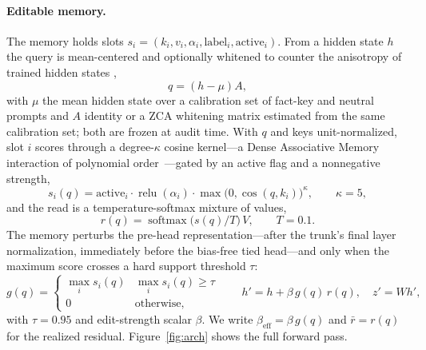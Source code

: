 \documentclass[11pt]{article}
\theoremstyle{remark}
\DeclareMathOperator{\relu}{relu}
\DeclareMathOperator{\softmax}{softmax}
\begin{document}
\paragraph{Editable memory.} The memory holds slots
$s_i=(k_i,v_i,\alpha_i,\text{label}_i,\text{active}_i)$. From a hidden state $h$
the query is mean-centered and optionally whitened to counter the anisotropy of
trained hidden states \citep{ethayarajh2019contextual, gao2019degeneration},
\begin{equation}
q=(h-\mu)A,
\end{equation}
with $\mu$ the mean hidden state over a calibration set of fact-key and neutral
prompts and $A$ identity or a ZCA whitening matrix estimated from the same
calibration set; both are frozen at audit time. With $q$ and
keys unit-normalized, slot $i$ scores through a degree-$\kappa$ cosine kernel---a
Dense Associative Memory interaction of polynomial order~\citep{krotov2016dense}---gated
by an active flag and a nonnegative strength,
\begin{equation}
s_i(q)=\text{active}_i\cdot\relu(\alpha_i)\cdot\max\!\big(0,\cos(q,k_i)\big)^{\kappa},\qquad \kappa=5,
\label{eq:score}
\end{equation}
and the read is a temperature-softmax mixture of values,
\begin{equation}
r(q)=\softmax\!\big(s(q)/T\big)\,V,\qquad T=0.1.
\end{equation}
The memory perturbs the pre-head representation---after the trunk's final layer
normalization, immediately before the bias-free tied head---and only when the
maximum score crosses a hard support threshold $\tau$:
\begin{equation}
g(q)=\begin{cases}\max_i s_i(q) & \max_i s_i(q)\ge\tau\\ 0 & \text{otherwise,}\end{cases}
\qquad h'=h+\beta\,g(q)\,r(q),\quad z'=Wh',
\label{eq:hook}
\end{equation}
with $\tau=0.95$ and edit-strength scalar $\beta$. We write
$\beta_{\mathrm{eff}}=\beta\,g(q)$ and $\bar r=r(q)$ for the realized residual.
Figure~\ref{fig:arch} shows the full forward pass.
\end{document}

